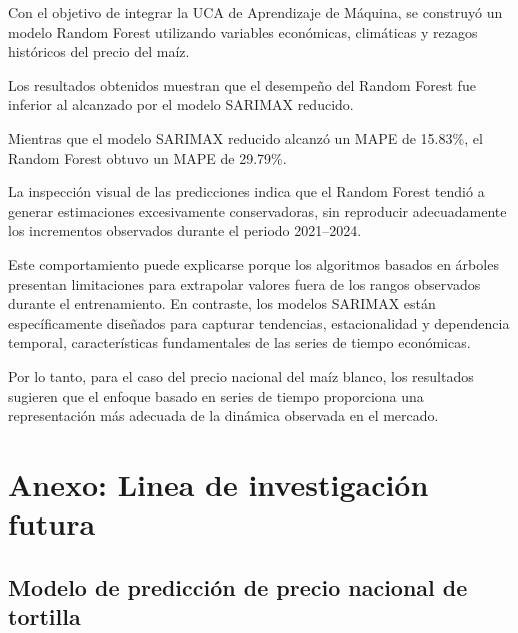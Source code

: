 \documentclass[11pt]{article}
\begin{document}
Con el objetivo de integrar la UCA de Aprendizaje de Máquina, se
construyó un modelo Random Forest utilizando variables económicas,
climáticas y rezagos históricos del precio del maíz.

Los resultados obtenidos muestran que el desempeño del Random Forest fue
inferior al alcanzado por el modelo SARIMAX reducido.

Mientras que el modelo SARIMAX reducido alcanzó un MAPE de 15.83\%, el
Random Forest obtuvo un MAPE de 29.79\%.

La inspección visual de las predicciones indica que el Random Forest
tendió a generar estimaciones excesivamente conservadoras, sin
reproducir adecuadamente los incrementos observados durante el periodo
2021--2024.

Este comportamiento puede explicarse porque los algoritmos basados en
árboles presentan limitaciones para extrapolar valores fuera de los
rangos observados durante el entrenamiento. En contraste, los modelos
SARIMAX están específicamente diseñados para capturar tendencias,
estacionalidad y dependencia temporal, características fundamentales de
las series de tiempo económicas.

Por lo tanto, para el caso del precio nacional del maíz blanco, los
resultados sugieren que el enfoque basado en series de tiempo
proporciona una representación más adecuada de la dinámica observada en
el mercado.

    \hypertarget{anexo-linea-de-investigaciuxf3n-futura}{%
\section{Anexo: Linea de investigación
futura}\label{anexo-linea-de-investigaciuxf3n-futura}}

\hypertarget{modelo-de-predicciuxf3n-de-precio-nacional-de-tortilla}{%
\subsection{Modelo de predicción de precio nacional de
tortilla}\label{modelo-de-predicciuxf3n-de-precio-nacional-de-tortilla}}
\end{document}
